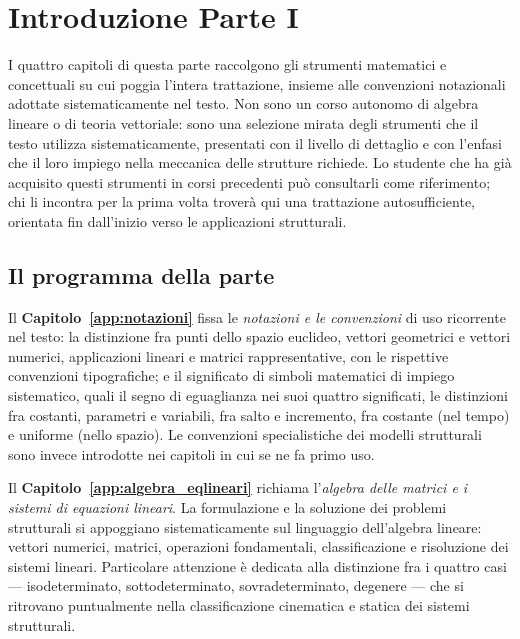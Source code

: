
\chapter*{Introduzione Parte I}

I quattro capitoli di questa parte raccolgono gli strumenti 
matematici e concettuali su cui poggia l'intera trattazione, 
insieme alle convenzioni notazionali adottate sistematicamente 
nel testo. Non sono un corso autonomo di algebra lineare o di 
teoria vettoriale: sono una selezione mirata degli strumenti 
che il testo utilizza sistematicamente, presentati con il 
livello di dettaglio e con l'enfasi che il loro impiego nella 
meccanica delle strutture richiede. Lo studente che ha già acquisito 
questi strumenti in corsi precedenti può consultarli come 
riferimento; chi li incontra per la prima volta troverà qui 
una trattazione autosufficiente, orientata fin dall'inizio 
verso le applicazioni strutturali.

\section*{Il programma della parte}

Il \textbf{Capitolo~\ref{app:notazioni}} fissa le 
\emph{notazioni e le convenzioni} di uso ricorrente nel testo: 
la distinzione fra punti dello spazio euclideo, vettori 
geometrici e vettori numerici, applicazioni lineari e matrici 
rappresentative, con le rispettive convenzioni tipografiche; 
e il significato di simboli matematici di impiego sistematico, 
quali il segno di eguaglianza nei suoi quattro significati, le 
distinzioni fra costanti, parametri e variabili, fra salto e 
incremento, fra costante (nel tempo) e uniforme (nello spazio). 
Le convenzioni specialistiche dei modelli strutturali sono 
invece introdotte nei capitoli in cui se ne fa primo uso.

Il \textbf{Capitolo~\ref{app:algebra_eqlineari}} richiama 
l'\emph{algebra delle matrici e i sistemi di equazioni lineari}. 
La formulazione e la soluzione dei problemi strutturali si 
appoggiano sistematicamente sul linguaggio dell'algebra lineare: 
vettori numerici, matrici, operazioni fondamentali, 
classificazione e risoluzione dei sistemi lineari. Particolare 
attenzione è dedicata alla distinzione fra i quattro casi --- 
isodeterminato, sottodeterminato, sovradeterminato, degenere --- 
che si ritrovano puntualmente nella classificazione cinematica e 
statica dei sistemi strutturali.

